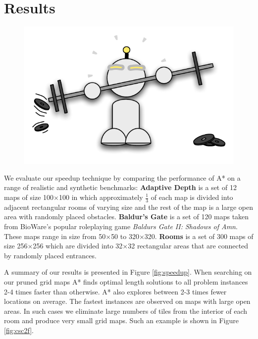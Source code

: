 \section{Results}
 \begin{figure}
\vspace{-5em}
		\includegraphics[width=0.45\columnwidth, trim=10mm 0mm 0mm 0mm]{diagrams/robot_weights.pdf}
 \end{figure}

We evaluate our speedup technique by comparing the performance of A* on a range of realistic and synthetic benchmarks:
\newline 
\textbf{Adaptive Depth} is a set of 12 maps of size 100$\times$100 in which approximately
$\frac{1}{3}$ of each map is divided into adjacent rectangular rooms of
varying size and the rest of the map is a large open area with randomly placed obstacles.
\newline
\textbf{Baldur's Gate} is a set of 120 maps taken from BioWare's popular
roleplaying game \emph{Baldurs Gate II: Shadows of Amn}. 
These maps range in size from 50$\times$50 to 320$\times$320.
\newline
\textbf{Rooms} is a set of 300 maps of size 256$\times$256 which are divided into 32$\times$32
rectangular areas that are connected by randomly placed entrances.
\newline 

A summary of our results is presented in Figure \ref{fig:speedup}.
When searching on our pruned grid maps A* finds optimal length solutions to all problem 
instances 2-4 times faster than otherwise.
A* also explores between 2-3 times fewer locations on average. 
The fastest instances are observed on maps with large open areas.
In such cases we eliminate large numbers of tiles from the interior of each room 
and produce very small grid maps. 
Such an example is shown in Figure \ref{fig:csc2f}.

